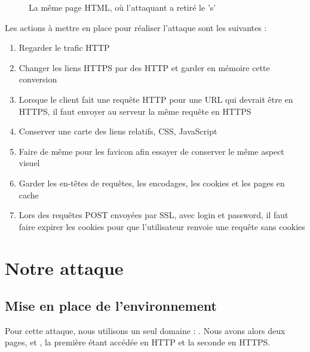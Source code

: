 \begin{figure}[H]
  \caption{La même page HTML, où l'attaquant a retiré le 's'}
\end{figure}

Les actions à mettre en place pour réaliser l'attaque sont les suivantes :

\begin{enumerate}
\item Regarder le trafic HTTP
\item Changer les liens HTTPS par des HTTP et garder en mémoire cette conversion
\item Lorsque le client fait une requête HTTP pour une URL qui devrait être en HTTPS, il faut envoyer au serveur la même requête en HTTPS
\item Conserver une carte des liens relatifs, CSS, JavaScript
\item Faire de même pour les favicon afin essayer de conserver le même aspect visuel
\item Garder les en-têtes de requêtes, les encodages, les cookies et les pages en cache
\item Lors des requêtes POST envoyées par SSL, avec login et password, il faut faire expirer les cookies pour que l'utilisateur renvoie une requête sans cookies
\end{enumerate}

\section{Notre attaque}

\subsection{Mise en place de l'environnement}

Pour cette attaque, nous utilisons un seul domaine : . Nous avons alors deux pages,  et , la première étant accédée en HTTP et la seconde en HTTPS.

